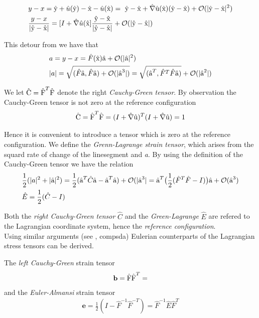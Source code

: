 \begin{align*}
&y - x = \text{\^{y}} + \hat{u}(\text{\^{y}}) - \text{\^{x}} - \hat{u}(\text{\^{x}}) = \
\text{\^{y}} - \text{\^{x}} + \hat{\nabla}\text{\^{u}}(\text{\^{x}}) (\text{\^{y}} - \text{\^{x}}) 
+ \mathcal{O}(|\text{\^{y}} - \text{\^{x}} |^2) \\
&\frac{y - x}{|\text{\^{y}} - \text{\^{x}}|} = [I + \hat{\nabla}\hat{u}(\text{\^{x}} ]  
\frac{\text{\^{y}} - \text{\^{x}}}{|\text{\^{y}} - \text{\^{x}}|} + \mathcal{O}(|\text{\^{y}} - \text{\^{x}} |) 
\end{align*}

This detour from \cite{Richter2016}  we have that 
\begin{align*}
&a = y - x = \hat{F}(\text{\^{x}})\text{\^{a}} +  \mathcal{O}(|\text{\^{a}} |^2) \\
&|a| = \sqrt{ (\hat{F}\text{\^{a}},\hat{F}\text{\^{a}})+ \mathcal{O} (|\text{\^{a}}^3|)  } = 
 \sqrt{ (\text{\^{a}}^T, \hat{F}^T\hat{F}\text{\^{a}})} + \mathcal{O} (|\text{\^{a}}^2|)  
\end{align*}

We let $\text{\^{C}} = \text{\^{F}}^T \text{\^{F}}$ denote the right \textit{Cauchy-Green tensor}.
By observation the Cauchy-Green tensor is not zero at the reference configuration 
\begin{align*}
\text{\^{C}} =  \text{\^{F}}^T \text{\^{F}} = (I + \hat{\nabla} \text{\^{u}})^T (I + \hat{\nabla} \text{\^{u}}) = 1
\end{align*}

Hence it is convenient to introduce a tensor which is zero at the reference configuration. We define the \textit{Grenn-Lagrange strain tensor}, which arises from the squard rate of change of the linesegment  and \textit{a}. By using the definition of the Cauchy-Green tensor we have the relation
\begin{align*}
&\frac{1}{2}(|a|^2 + |\text{\^{a}}|^2) = \frac{1}{2}(\text{\^{a}}^T\hat{C}\text{\^{a}}
 -\text{\^{a}}^T \text{\^{a}} ) + \mathcal{O}(|\text{\^{a}}^3| = 
 \text{\^{a}}^T \big(\frac{1}{2} (\hat{F}^T \hat{F} - I) \big) \text{\^{a}} 
 + \mathcal{O}(\text{\^{a}}^3) \\
&\hat{E} = \frac{1}{2}(\hat{C} - I)
\end{align*}

Both the \textit{right Cauchy-Green tensor} $\hat{C}$ and the \textit{Green-Lagrange} $\hat{E}$ are refered to the Lagrangian coordinate system, hence the \textit{reference configuration}. \\
Using similar arguments (see \cite{Richter2016}, compsda) Eulerian counterparts of the Lagrangian stress tensors can be derived.

The \textit{left Cauchy-Green} strain tensor 
\begin{align*}
\mathbf{b} = \text{\^{F}} \text{\^{F}}^T = 
\end{align*}
and the \textit{Euler-Almansi} strain tensor
\begin{align*}
\mathbf{e} = \frac{1}{2} (I - \hat{F}^{-1}\hat{F}^{-T}) = \hat{F}^{-1}\hat{E}\hat{F}^{T}
\end{align*}

